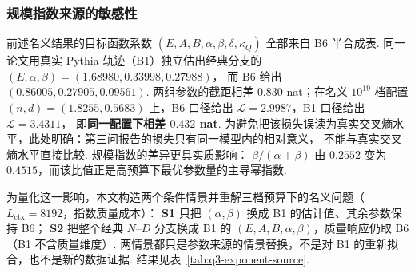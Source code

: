 \subsubsection{规模指数来源的敏感性}\label{sec:q3-exponent-source}
前述名义结果的目标函数系数 $(E,A,B,\alpha,\beta,\delta,\kappa_Q)$ 全部来自 B6 半合成表. 
同一论文用真实 Pythia 轨迹（B1）独立估出经典分支的 $(E,\alpha,\beta)=(1.68980,0.33998,0.27988)$，
而 B6 给出 $(0.86005,0.27905,0.09561)$. 两组参数的截距相差 $0.830$ nat；在名义 $10^{19}$ 档配置
$(n,d)=(1.8255,0.5683)$ 上，B6 口径给出 $\mathcal L=2.9987$，B1 口径给出 $\mathcal L=3.4311$，
即\textbf{同一配置下相差 $0.432$ nat}. 为避免把该损失误读为真实交叉熵水平，此处明确：第三问报告的损失只有同一模型内的相对意义，
不能与真实交叉熵水平直接比较. 规模指数的差异更具实质影响：
$\beta/(\alpha+\beta)$ 由 $0.2552$ 变为 $0.4515$，而该比值正是高预算下最优参数量的主导幂指数. 

为量化这一影响，本文构造两个条件情景并重解三档预算下的名义问题（$L_{\mathrm{ctx}}=8192$，指数质量成本）：
\textbf{S1} 只把 $(\alpha,\beta)$ 换成 B1 的估计值、其余参数保持 B6；
\textbf{S2} 把整个经典 $N$--$D$ 分支换成 B1 的 $(E,A,B,\alpha,\beta)$，质量响应仍取 B6（B1 不含质量维度）. 
两情景都只是参数来源的情景替换，不是对 B1 的重新拟合，也不是新的数据证据. 结果见表~\ref{tab:q3-exponent-source}. 

